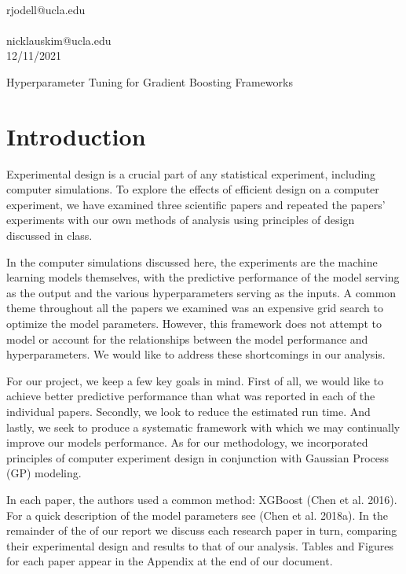 \documentclass[12pt]{article}
\begin{document}
 \\
rjodell@ucla.edu \\
 \\
nicklauskim@ucla.edu\\
12/11/2021 
\begin{center}
{\huge Hyperparameter Tuning for Gradient Boosting Frameworks } 
\end{center}

\section{Introduction}
Experimental design is a crucial part of any statistical experiment, including computer simulations. To explore the effects of efficient design on a computer experiment, we have examined three scientific papers and repeated the papers’ experiments with our own methods of analysis using principles of design discussed in class. 

In the computer simulations discussed here, the experiments are the machine learning models themselves, with the predictive performance of the model serving as the output and the various hyperparameters serving as the inputs. A common theme throughout all the papers we examined was an expensive grid search to optimize the model parameters. However, this framework does not attempt to model or account for the relationships between the model performance and hyperparameters. We would like to address these shortcomings in our analysis. 

 For our project, we keep a few key goals in mind. First of all, we would like to achieve better predictive performance than what was reported in each of the individual papers. Secondly, we look to reduce the estimated run time. And lastly, we seek to produce a systematic framework with which we may continually improve our models performance. As for our methodology, we incorporated principles of computer experiment design in conjunction with Gaussian Process (GP) modeling.
 
In each paper, the authors used a common method: XGBoost (Chen et al. 2016). For a quick description of the model parameters see (Chen et al. 2018a). In the remainder of the of our report we discuss each research paper in turn, comparing their experimental design and results to that of our analysis. Tables and Figures for each paper appear in the Appendix at the end of our document.
\end{document}
